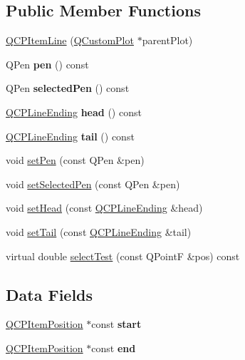 \subsection*{Public Member Functions}
\begin{DoxyCompactItemize}
\item 
\hyperlink{classQCPItemLine_a17804b7f64961c6accf25b61e85142e3}{Q\-C\-P\-Item\-Line} (\hyperlink{classQCustomPlot}{Q\-Custom\-Plot} $\ast$parent\-Plot)
\item 
\hypertarget{classQCPItemLine_a235779dd079a263bedb20b3daecc40eb}{Q\-Pen {\bfseries pen} () const }\label{classQCPItemLine_a235779dd079a263bedb20b3daecc40eb}

\item 
\hypertarget{classQCPItemLine_a9fde5e95a1a369008252e18f1925650c}{Q\-Pen {\bfseries selected\-Pen} () const }\label{classQCPItemLine_a9fde5e95a1a369008252e18f1925650c}

\item 
\hypertarget{classQCPItemLine_a5f6cbc5c763feae9dfbce71748fc43f1}{\hyperlink{classQCPLineEnding}{Q\-C\-P\-Line\-Ending} {\bfseries head} () const }\label{classQCPItemLine_a5f6cbc5c763feae9dfbce71748fc43f1}

\item 
\hypertarget{classQCPItemLine_a5d2ca0f784933e80f3e6e1d15dceebb3}{\hyperlink{classQCPLineEnding}{Q\-C\-P\-Line\-Ending} {\bfseries tail} () const }\label{classQCPItemLine_a5d2ca0f784933e80f3e6e1d15dceebb3}

\item 
void \hyperlink{classQCPItemLine_a572528dab61c1abe205822fbd5db4b27}{set\-Pen} (const Q\-Pen \&pen)
\item 
void \hyperlink{classQCPItemLine_a3e2fec44503277e77717e9c24f87f1ea}{set\-Selected\-Pen} (const Q\-Pen \&pen)
\item 
void \hyperlink{classQCPItemLine_aebf3d687114d584e0459db6759e2c3c3}{set\-Head} (const \hyperlink{classQCPLineEnding}{Q\-C\-P\-Line\-Ending} \&head)
\item 
void \hyperlink{classQCPItemLine_ac264222c3297a7efe33df9345c811a5f}{set\-Tail} (const \hyperlink{classQCPLineEnding}{Q\-C\-P\-Line\-Ending} \&tail)
\item 
virtual double \hyperlink{classQCPItemLine_abc195de27d00ffa02c9047489308a6a7}{select\-Test} (const Q\-Point\-F \&pos) const 
\end{DoxyCompactItemize}
\subsection*{Data Fields}
\begin{DoxyCompactItemize}
\item 
\hypertarget{classQCPItemLine_a602da607a09498b0f152ada1d6851bc5}{\hyperlink{classQCPItemPosition}{Q\-C\-P\-Item\-Position} $\ast$const {\bfseries start}}\label{classQCPItemLine_a602da607a09498b0f152ada1d6851bc5}

\item 
\hypertarget{classQCPItemLine_a15598864c1c22a2497a1979c4980c4e1}{\hyperlink{classQCPItemPosition}{Q\-C\-P\-Item\-Position} $\ast$const {\bfseries end}}\label{classQCPItemLine_a15598864c1c22a2497a1979c4980c4e1}

\end{DoxyCompactItemize}
